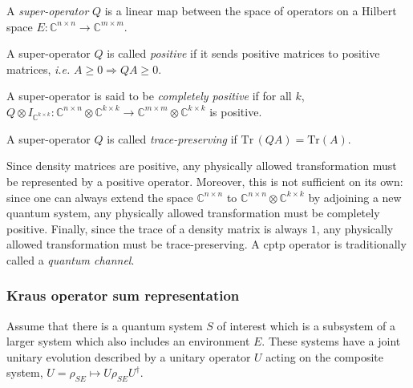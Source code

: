 
\begin{definition}
  A \emph{super-operator} $Q$ is a linear map between the space of operators on a Hilbert space $E: \mathbb{C}^{n\times n} \rightarrow  \mathbb{C}^{m\times m}$. 
\end{definition}

\begin{definition} \label{def:positive_superoperator}
  A super-operator $Q$ is called \emph{positive} if it sends positive matrices to positive matrices, \textit{i.e.} $A \geq 0 \Rightarrow{} Q A \geq 0$.
\end{definition}

\begin{definition} \label{def:completely_positive_superoperator}
  A super-operator is said to be \emph{completely positive} if for all $k$, $Q \otimes I_{\mathbb{C}^{k \times k}}: \mathbb{C}^{n \times n} \otimes \mathbb{C}^{k \times k} \rightarrow \mathbb{C}^{m \times m} \otimes \mathbb{C}^{k \times k}  $ is positive.
\end{definition}

\begin{definition}
  A super-operator $Q$ is called \emph{trace-preserving} if $\text{Tr} \hspace{2pt} (Q A)= \text{Tr} (A)$.
\end{definition}

Since density matrices are positive, any physically allowed transformation must be represented by a positive operator. Moreover, this is not sufficient on its own: since one can always extend the space $\mathbb{C}^{n \times n}$ to  $\mathbb{C}^{n \times n} \otimes \mathbb{C}^{k \times k} $ by adjoining a new quantum system, any physically allowed transformation must be completely positive. Finally, since the trace of a density matrix is always $1$, any physically allowed transformation must be trace-preserving. A \acrfull{cptp} operator is traditionally called a \emph{quantum channel}.

\subsubsection{Kraus operator sum representation}
Assume that there is a quantum system $S$ of interest which is a subsystem of a larger system which also includes an environment $E$. These systems have a joint unitary evolution described by a unitary operator $U$ acting on the composite system, $U = \rho_{SE} \mapsto U \rho_{SE} U^{\dag}$. 

